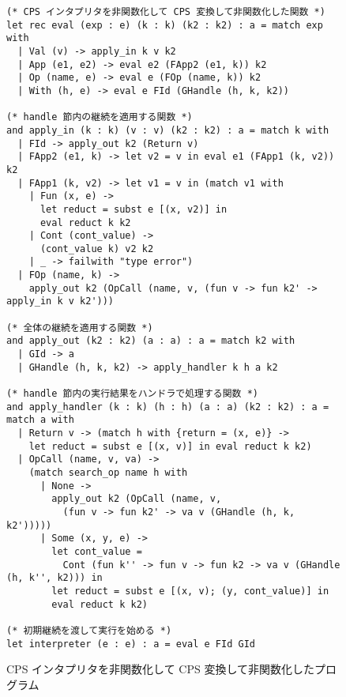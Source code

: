 \begin{figure}
\begin{spacing}{0.9} 
\begin{verbatim}
(* CPS インタプリタを非関数化して CPS 変換して非関数化した関数 *)
let rec eval (exp : e) (k : k) (k2 : k2) : a = match exp with
  | Val (v) -> apply_in k v k2
  | App (e1, e2) -> eval e2 (FApp2 (e1, k)) k2
  | Op (name, e) -> eval e (FOp (name, k)) k2
  | With (h, e) -> eval e FId (GHandle (h, k, k2))

(* handle 節内の継続を適用する関数 *)
and apply_in (k : k) (v : v) (k2 : k2) : a = match k with
  | FId -> apply_out k2 (Return v)
  | FApp2 (e1, k) -> let v2 = v in eval e1 (FApp1 (k, v2)) k2
  | FApp1 (k, v2) -> let v1 = v in (match v1 with
    | Fun (x, e) ->
      let reduct = subst e [(x, v2)] in
      eval reduct k k2
    | Cont (cont_value) ->
      (cont_value k) v2 k2
    | _ -> failwith "type error")
  | FOp (name, k) ->
    apply_out k2 (OpCall (name, v, (fun v -> fun k2' -> apply_in k v k2')))

(* 全体の継続を適用する関数 *)
and apply_out (k2 : k2) (a : a) : a = match k2 with
  | GId -> a
  | GHandle (h, k, k2) -> apply_handler k h a k2

(* handle 節内の実行結果をハンドラで処理する関数 *)
and apply_handler (k : k) (h : h) (a : a) (k2 : k2) : a = match a with
  | Return v -> (match h with {return = (x, e)} ->
    let reduct = subst e [(x, v)] in eval reduct k k2)
  | OpCall (name, v, va) ->
    (match search_op name h with
      | None ->
        apply_out k2 (OpCall (name, v,
          (fun v -> fun k2' -> va v (GHandle (h, k, k2')))))
      | Some (x, y, e) ->
        let cont_value =
          Cont (fun k'' -> fun v -> fun k2 -> va v (GHandle (h, k'', k2))) in
        let reduct = subst e [(x, v); (y, cont_value)] in
        eval reduct k k2)

(* 初期継続を渡して実行を始める *)
let interpreter (e : e) : a = eval e FId GId
\end{verbatim}
\caption{CPS インタプリタを非関数化して CPS 変換して非関数化したプログラム}
\label{figure:4defun}
\end{spacing}
\end{figure}

